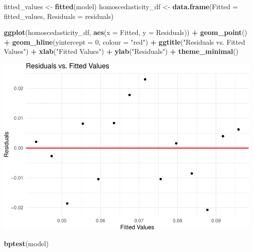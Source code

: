 \documentclass[
]{article}
\newenvironment{Shaded}{\begin{snugshade}}{\end{snugshade}}
\newcommand{\AttributeTok}[1]{\textcolor[rgb]{0.13,0.29,0.53}{#1}}
\newcommand{\DecValTok}[1]{\textcolor[rgb]{0.00,0.00,0.81}{#1}}
\newcommand{\FunctionTok}[1]{\textcolor[rgb]{0.13,0.29,0.53}{\textbf{#1}}}
\newcommand{\NormalTok}[1]{#1}
\newcommand{\OtherTok}[1]{\textcolor[rgb]{0.56,0.35,0.01}{#1}}
\newcommand{\SpecialCharTok}[1]{\textcolor[rgb]{0.81,0.36,0.00}{\textbf{#1}}}
\newcommand{\StringTok}[1]{\textcolor[rgb]{0.31,0.60,0.02}{#1}}
\begin{document}
\begin{Shaded}
\begin{Highlighting}[]
\NormalTok{fitted\_values }\OtherTok{\textless{}{-}} \FunctionTok{fitted}\NormalTok{(model)}
\NormalTok{homoscedasticity\_df }\OtherTok{\textless{}{-}} \FunctionTok{data.frame}\NormalTok{(}\AttributeTok{Fitted =}\NormalTok{ fitted\_values, }\AttributeTok{Residuals =}\NormalTok{ residuals)}

\FunctionTok{ggplot}\NormalTok{(homoscedasticity\_df, }\FunctionTok{aes}\NormalTok{(}\AttributeTok{x =}\NormalTok{ Fitted, }\AttributeTok{y =}\NormalTok{ Residuals)) }\SpecialCharTok{+}
    \FunctionTok{geom\_point}\NormalTok{() }\SpecialCharTok{+} \FunctionTok{geom\_hline}\NormalTok{(}\AttributeTok{yintercept =} \DecValTok{0}\NormalTok{, }\AttributeTok{colour =} \StringTok{"red"}\NormalTok{) }\SpecialCharTok{+}
    \FunctionTok{ggtitle}\NormalTok{(}\StringTok{"Residuals vs. Fitted Values"}\NormalTok{) }\SpecialCharTok{+} \FunctionTok{xlab}\NormalTok{(}\StringTok{"Fitted Values"}\NormalTok{) }\SpecialCharTok{+}
    \FunctionTok{ylab}\NormalTok{(}\StringTok{"Residuals"}\NormalTok{) }\SpecialCharTok{+} \FunctionTok{theme\_minimal}\NormalTok{()}
\end{Highlighting}
\end{Shaded}

\includegraphics{602_project_files/figure-latex/unnamed-chunk-9-1.pdf}

\begin{Shaded}
\begin{Highlighting}[]
\FunctionTok{bptest}\NormalTok{(model)}
\end{Highlighting}
\end{Shaded}
\end{document}
